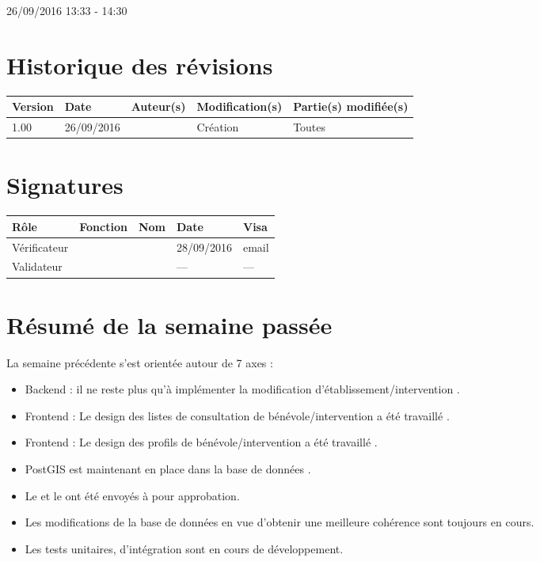 \documentclass [a4paper] {article}
\begin{document}
26/09/2016			 				%
\hfill   
\hfill 	 13:33 - 14:30				%


\section*{Historique des révisions}
\begin{center}
			\begin{tabular}{| p{2.5cm} | p{3cm} | p{3cm} | p{3cm} | p{3.5cm} |}
				\hline
				\rowcolor{Gray}
				Version & Date & Auteur(s) & Modification(s) & Partie(s) modifiée(s)		 \\
				\hline
				1.00 & 26/09/2016 & \Kafui & Création & Toutes \\
				\hline			
			\end{tabular}
		\end{center}

\section*{Signatures}

		\begin{center}
			\begin{tabular}{| p{2.5cm} | p{4cm} | p{3cm} | p{3cm} | p{2.5cm} |}
				\hline
				\rowcolor{Gray}
				Rôle & Fonction & Nom & Date & Visa		 \\
				\hline
				Vérificateur & \RGC & \Melissa & 28/09/2016 & email \\[30pt]
				\hline
				Validateur & \CP & \Pierre &  --- & --- \\[30pt]	
				\hline
			\end{tabular}
		\end{center}

\section{Résumé de la semaine passée}
La semaine précédente s'est orientée autour de 7 axes :  
\begin{itemize}
\item Backend : il ne reste plus qu'à implémenter la modification d'établissement/intervention .
\item Frontend : Le design des listes de consultation de bénévole/intervention a été travaillé .
\item Frontend : Le design des profils de bénévole/intervention a été travaillé .
\item PostGIS est maintenant en place dans la base de données .
\item Le \PGC{} et le \PQ{} ont été envoyés à \nomTuteurQualite{} pour approbation.
\item Les modifications de la base de données en vue d'obtenir une meilleure cohérence sont toujours en cours.
\item Les tests unitaires, d'intégration sont en cours de développement.
\end{itemize} 
\end{document}
